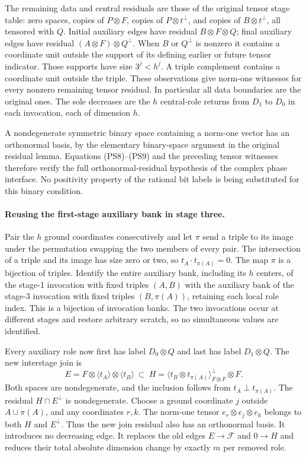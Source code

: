 The remaining data and central residuals are those of the original tensor
stage table: zero spaces, copies of $P\otimes F$, copies of
$P\otimes t^\perp$, and copies of $B\otimes t^\perp$, all tensored
with $Q$.  Initial auxiliary edges have residual $B\otimes F\otimes Q$;
final auxiliary edges have residual $(A\otimes F)\otimes Q^\perp$.
When $B$ or $Q^\perp$ is nonzero it contains a coordinate unit outside
the support of its defining earlier or future tensor indicator.  Those
supports have size $3^j<h^j$.  A triple complement contains a coordinate
unit outside the triple.  These observations give norm-one witnesses for
every nonzero remaining tensor residual.  In particular all data boundaries
are the original ones.  The sole decreases are the $h$ central-role
returns from $D_1$ to $D_0$ in each invocation, each of dimension $h$.

A nondegenerate symmetric binary space containing a norm-one vector has an
orthonormal basis, by the elementary binary-space argument in the original
residual lemma.  Equations (PS8)--(PS9) and the preceding tensor witnesses
therefore verify the full orthonormal-residual hypothesis of the complex
phase interface.  No positivity property of the rational bit labels is
being substituted for this binary condition.

\paragraph{Reusing the first-stage auxiliary bank in stage three.}
Pair the $h$ ground coordinates consecutively and let $\pi$ send a triple
to its image under the permutation swapping the two members of every pair.
The intersection of a triple and its image has size zero or two, so
$t_A\cdot t_{\pi(A)}=0$.  The map $\pi$ is a bijection of triples.
Identify the entire auxiliary bank, including its $h$ centers, of the
stage-1 invocation with fixed triples $(A,B)$ with the auxiliary bank of
the stage-3 invocation with fixed triples $(B,\pi(A))$, retaining each
local role index.  This is a bijection of invocation banks.  The two
invocations occur at different stages and restore arbitrary scratch, so
no simultaneous values are identified.

Every auxiliary role now first has label $D_0\otimes Q$ and last has
label $D_1\otimes Q$.  The new interstage join is
\[
 E=F\otimes\langle t_A\rangle\otimes\langle t_B\rangle
 \ \subset\
 H=\langle t_B\otimes t_{\pi(A)}\rangle^\perp_{F\otimes F}
                                                 \otimes F.     \tag{PS10}
\]
Both spaces are nondegenerate, and the inclusion follows from
$t_A\perp t_{\pi(A)}$.  The residual $H\cap E^\perp$ is nondegenerate.
Choose a ground coordinate $j$ outside $A\cup\pi(A)$, and any coordinates
$r,k$.  The norm-one tensor $e_r\otimes e_j\otimes e_k$ belongs to
both $H$ and $E^\perp$.  Thus the new join residual also has an orthonormal
basis.  It introduces no decreasing edge.  It replaces the old edges
$E\to\mathcal F$ and $0\to H$ and reduces their total absolute
dimension change by exactly $m$ per removed role.

